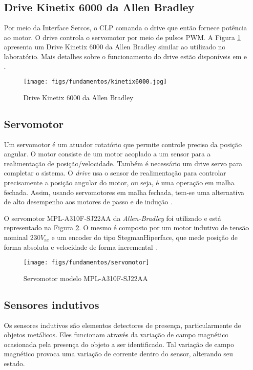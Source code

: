 \subsection{Drive Kinetix 6000 da Allen Bradley}

Por meio da Interface Sercos, o CLP comanda o drive que então fornece potência ao motor. O drive controla o servomotor por meio de pulsos PWM. A Figura \ref{kinetix6000} apresenta um Drive Kinetix 6000 da Allen Bradley similar ao utilizado no laboratório. Mais detalhes sobre o funcionamento do drive estão disponíveis em \cite{redytton} e \cite{kinetix6000usermanual}.

\begin{figure}[!ht]
  \centering
    \texttt{[image: figs/fundamentos/kinetix6000.jpg]}
    \caption{Drive Kinetix 6000 da Allen Bradley\label{kinetix6000}}
\end{figure}

\subsection{Servomotor}

Um servomotor é um atuador rotatório que permite controle preciso da posição angular. O motor consiste de um motor acoplado a um sensor para a realimentação de posição/velocidade. Também é necessário um drive servo para completar o sistema. O \textit{drive} usa o sensor de realimentação para controlar precisamente a posição angular do motor, ou seja, é uma operação em malha fechada. Assim, usando servomotores em malha fechada, tem-se uma alternativa de alto desempenho aos motores de passo e de indução \cite{defServoMotores}.

O servomotor MPL-A310F-SJ22AA da \textit{Allen-Bradley} foi utilizado e está representado na Figura \ref{servomotor}. O mesmo é composto por um motor indutivo de tensão nominal $230V_{\mathrm{ac}}$ e um encoder do tipo StegmanHiperface, que mede posição de forma absoluta e velocidade de forma incremental \cite{redytton}.

\begin{figure}[!ht]
  \centering
    \texttt{[image: figs/fundamentos/servomotor]}
    \caption{Servomotor modelo MPL-A310F-SJ22AA\label{servomotor}}
\end{figure}

\subsection{Sensores indutivos}
Os sensores indutivos são elementos detectores de presença, particularmente de objetos metálicos. Eles funcionam através da variação de campo magnético ocasionada pela presença do objeto a ser identificado. Tal variação de campo magnético provoca uma variação de corrente dentro do sensor, alterando seu estado.

